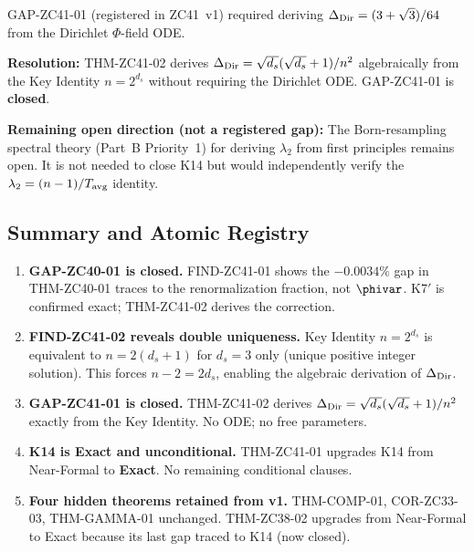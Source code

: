 \documentclass[12pt, a4paper]{article}
\begin{document}
\begin{formalbox}[title={GAP-ZC41-01: \textit{Closed by THM-ZC41-02}}]
GAP-ZC41-01 (registered in ZC41~v1) required deriving
$\Delta_{\rm Dir} = (3+\sqrt{3})/64$ from the Dirichlet
$\Phi$-field ODE.

\textbf{Resolution:}
THM-ZC41-02 derives $\Delta_{\rm Dir} = \sqrt{d_s}(\sqrt{d_s}+1)/n^2$
algebraically from the Key Identity $n = 2^{d_s}$ without
requiring the Dirichlet ODE.
GAP-ZC41-01 is \textbf{closed}.

\medskip
\noindent\textbf{Remaining open direction (not a registered gap):}
The Born-resampling spectral theory (Part~B Priority~1) for
deriving $\lambda_2$ from first principles remains open.
It is not needed to close K14 but would independently verify
the $\lambda_2 = (n-1)/T_{\rm avg}$ identity.
\end{formalbox}

\subsection{Summary and Atomic Registry}
\label{sec:summary}

\begin{enumerate}[leftmargin=2em]

  \item \textbf{GAP-ZC40-01 is closed.}
    FIND-ZC41-01 shows the $-0.0034\%$ gap in THM-ZC40-01 traces
    to the renormalization fraction, not $\phivar$.
    K7$'$ is confirmed exact; THM-ZC41-02 derives the correction.

  \item \textbf{FIND-ZC41-02 reveals double uniqueness.}
    Key Identity $n = 2^{d_s}$ is equivalent to $n = 2(d_s+1)$
    for $d_s = 3$ only (unique positive integer solution).
    This forces $n-2 = 2d_s$, enabling the algebraic derivation
    of $\Delta_{\rm Dir}$.

  \item \textbf{GAP-ZC41-01 is closed.}
    THM-ZC41-02 derives $\Delta_{\rm Dir} = \sqrt{d_s}(\sqrt{d_s}+1)/n^2$
    exactly from the Key Identity. No ODE; no free parameters.

  \item \textbf{K14 is Exact and unconditional.}
    THM-ZC41-01 upgrades K14 from Near-Formal to \textbf{Exact}.
    No remaining conditional clauses.

  \item \textbf{Four hidden theorems retained from v1.}
    THM-COMP-01, COR-ZC33-03, THM-GAMMA-01 unchanged.
    THM-ZC38-02 upgrades from Near-Formal to Exact because
    its last gap traced to K14 (now closed).

\end{enumerate}
\end{document}
